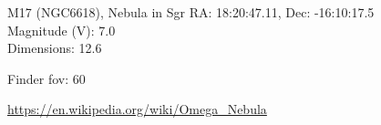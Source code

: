 \begin{block}{M17 (NGC6618), Nebula in Sgr}
    RA: 18:20:47.11, Dec: -16:10:17.5 \\ 
    Magnitude (V): 7.0 \\ 
    Dimensions: 12.6 

    Finder fov: 60 

    \url{https://en.wikipedia.org/wiki/Omega_Nebula} 
\end{block}